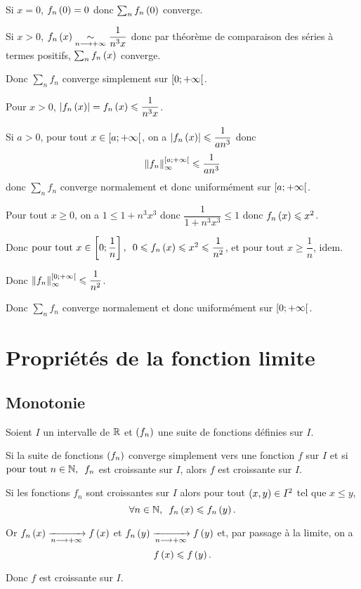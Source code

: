 \begin{corr}
Si \(x=0\), \(f_n\left(0\right)=0\) donc \(\sum_nf_n\left(0\right)\) converge.

Si \(x>0\), \(f_n\left(x\right)\underset{n\longrightarrow+\infty}{\sim}\dfrac{1}{n^3x}\) donc par théorème de comparaison des séries à termes positifs, \(\sum_nf_n\left(x\right)\) converge.

Donc \(\sum_nf_n\) converge simplement sur \(\left[0;+\infty\right[\).

Pour \(x>0\), \(\left\lvert f_n\left(x\right)\right\rvert=f_n\left(x\right)\leqslant\dfrac{1}{n^3x}\).

Si \(a>0\), pour tout \(x\in\left[a;+\infty\right[\), on a \(\left\lvert f_n\left(x\right)\right\rvert\leqslant\dfrac{1}{an^3}\) donc \[\norme{f_n}_\infty^{\intervie{a}{\pinf}}\leq\dfrac{1}{an^3}\] donc \(\sum_nf_n\) converge normalement et donc uniformément sur \(\left[a;+\infty\right[\).

Pour tout \(x\geq0\), on a \(1\leq1+n^3x^3\) donc \(\dfrac{1}{1+n^3x^3}\leq1\) donc \(f_n\left(x\right)\leqslant x^2\).

Donc \(\quantifs{\tpt x\in\intervii{0}{\dfrac{1}{n}}}0\leq f_n\paren{x}\leq x^2\leq\dfrac{1}{n^2}\), et pour tout \(x\geq\dfrac{1}{n}\), idem.

Donc \(\norme{f_n}_\infty^{\intervie{0}{\pinf}}\leq\dfrac{1}{n^2}\).

Donc \(\sum_nf_n\) converge normalement et donc uniformément sur \(\left[0;+\infty\right[\).
\end{corr}

\section{Propriétés de la fonction limite}

\subsection{Monotonie}

\begin{prop}
Soient \(I\) un intervalle de \(\mathbb{R}\) et \(\left(f_n\right)\) une suite de fonctions définies sur \(I\).

Si la suite de fonctions \(\left(f_n\right)\) converge simplement vers une fonction \(f\) sur \(I\) et si \(\quantifs{\tpt n\in\N}f_n\) est croissante sur \(I\), alors \(f\) est croissante sur \(I\).
\end{prop}

\begin{dem}
Si les fonctions \(f_n\) sont croissantes sur \(I\) alors pour tout \(\left(x,y\right)\in I^2\) tel que \(x\leq y\), \[\quantifs{\forall n\in\N}f_n\paren{x}\leq f_n\paren{y}.\]

Or \(f_n\left(x\right)\xrightarrow[n\longrightarrow+\infty]{}f\left(x\right)\) et \(f_n\left(y\right)\xrightarrow[n\longrightarrow+\infty]{}f\left(y\right)\) et, par passage à la limite, on a \[f\left(x\right)\leqslant f\left(y\right).\]

Donc \(f\) est croissante sur \(I\).
\end{dem}

